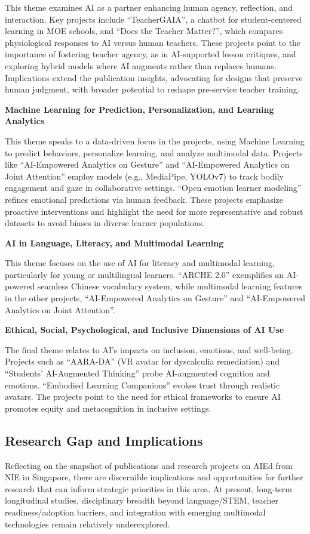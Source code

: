 \documentclass[english]{textolivre}
\begin{document}
    This theme examines AI as a partner enhancing human agency, reflection, and interaction. Key projects include “TeacherGAIA”, a chatbot for student-centered learning in MOE schools, and “Does the Teacher Matter?”, which compares physiological responses to AI versus human teachers. These projects point to the importance of fostering teacher agency, as in AI-supported lesson critiques, and exploring hybrid models where AI augments rather than replaces humans. Implications extend the publication insights, advocating for designs that preserve human judgment, with broader potential to reshape pre-service teacher training.

\textbf{Machine Learning for Prediction, Personalization, and Learning Analytics}

    This theme speaks to a data-driven focus in the projects, using Machine Learning to predict behaviors, personalize learning, and analyze multimodal data. Projects like “AI-Empowered Analytics on Gesture” and “AI-Empowered Analytics on Joint Attention” employ models (e.g., MediaPipe, YOLOv7) to track bodily engagement and gaze in collaborative settings. “Open emotion learner modeling” refines emotional predictions via human feedback. These projects emphasize proactive interventions and highlight the need for more representative and robust datasets to avoid biases in diverse learner populations.

\textbf{AI in Language, Literacy, and Multimodal Learning}

    This theme focuses on the use of AI for literacy and multimodal learning, particularly for young or multilingual learners. “ARCHE 2.0” exemplifies an AI-powered seamless Chinese vocabulary system, while multimodal learning features in the other projects, “AI-Empowered Analytics on Gesture” and “AI-Empowered Analytics on Joint Attention”.

\textbf{Ethical, Social, Psychological, and Inclusive Dimensions of AI Use}

    The final theme relates to AI’s impacts on inclusion, emotions, and well-being. Projects such as “AARA-DA” (VR avatar for dyscalculia remediation) and “Students’ AI-Augmented Thinking” probe AI-augmented cognition and emotions. “Embodied Learning Companions” evokes trust through realistic avatars. The projects point to the need for ethical frameworks to ensure AI promotes equity and metacognition in inclusive settings.


\subsection{Research Gap and Implications}\label{sec-organizacao-latex}
Reflecting on the snapshot of publications and research projects on AIEd from NIE in Singapore, there are discernible implications and opportunities for further research that can inform strategic priorities in this area. At present, long-term longitudinal studies, disciplinary breadth beyond language/STEM, teacher readiness/adoption barriers, and integration with emerging multimodal technologies remain relatively underexplored.
\end{document}
